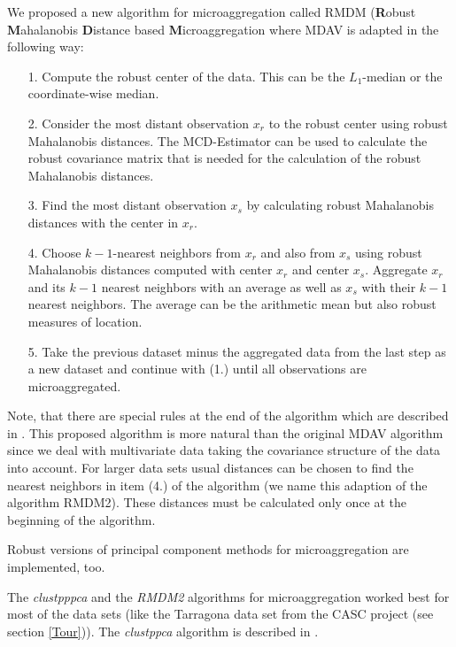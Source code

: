 \documentclass[12pt]{article}
\begin{document}
We proposed a new algorithm for microaggregation called RMDM ({\bf R}obust {\bf M}ahalanobis {\bf D}istance based {\bf M}icroaggregation where MDAV \citep{Domingo02} is adapted in the following way:
\begin{itemize}
  \item[1.] Compute the robust center of the data. This can be the $L_1$-median or the coordinate-wise median.
  \item[2.] Consider the most distant observation $x_r$ to the robust center using robust Mahalanobis distances. The MCD-Estimator can be used to calculate the robust covariance matrix that is needed for the calculation of the robust Mahalanobis distances.
  \item[3.] Find the most distant observation $x_s$ by calculating robust Mahalanobis distances with the center in $x_r$.
  \item[4.] Choose $k-1$-nearest neighbors from $x_r$ and also from $x_s$ using robust Mahalanobis distances computed with center $x_r$ and center $x_s$. Aggregate $x_r$ and its $k-1$ nearest neighbors with an average as well as $x_s$ with their $k-1$ nearest neighbors. The average can be the arithmetic mean but also robust measures of location.
  \item[5.] Take the previous dataset minus the aggregated data from the last step as a new dataset  and continue with (1.) until all observations are microaggregated.
\end{itemize}

Note, that there are special rules at the end of the algorithm which are described in \cite{Domingo02}. 
This proposed algorithm is more natural than the original MDAV algorithm since we deal with multivariate data taking the covariance structure of the data into account. For larger data sets usual distances can be chosen to find the nearest neighbors in item (4.) of the algorithm (we name this adaption of the algorithm RMDM2). These distances must be calculated only once at the beginning of the algorithm. 

Robust versions of principal component methods for microaggregation are implemented, too.

The {\it clustpppca} and the {\it RMDM2} algorithms for microaggregation worked best for most of the data sets (like the Tarragona data set from the CASC project (see section \ref{Tour})). %
The {\it clustppca} algorithm is described in \cite{Templ06}. 
\end{document}
